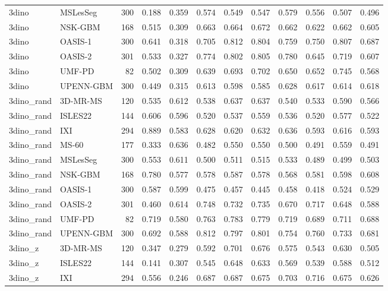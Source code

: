 \begin{tabular}{llrrrrrrrrrr}
3dino & MSLesSeg & 300 & 0.188 & 0.359 & 0.574 & 0.549 & 0.547 & 0.579 & 0.556 & 0.507 & 0.496 \\
3dino & NSK-GBM & 168 & 0.515 & 0.309 & 0.663 & 0.664 & 0.672 & 0.662 & 0.622 & 0.662 & 0.605 \\
3dino & OASIS-1 & 300 & 0.641 & 0.318 & 0.705 & 0.812 & 0.804 & 0.759 & 0.750 & 0.807 & 0.687 \\
3dino & OASIS-2 & 301 & 0.533 & 0.327 & 0.774 & 0.802 & 0.805 & 0.780 & 0.645 & 0.719 & 0.607 \\
3dino & UMF-PD & 82 & 0.502 & 0.309 & 0.639 & 0.693 & 0.702 & 0.650 & 0.652 & 0.745 & 0.568 \\
3dino & UPENN-GBM & 300 & 0.449 & 0.315 & 0.613 & 0.598 & 0.585 & 0.628 & 0.617 & 0.614 & 0.618 \\
3dino\_rand & 3D-MR-MS & 120 & 0.535 & 0.612 & 0.538 & 0.637 & 0.637 & 0.540 & 0.533 & 0.590 & 0.566 \\
3dino\_rand & ISLES22 & 144 & 0.606 & 0.596 & 0.520 & 0.537 & 0.559 & 0.536 & 0.520 & 0.577 & 0.522 \\
3dino\_rand & IXI & 294 & 0.889 & 0.583 & 0.628 & 0.620 & 0.632 & 0.636 & 0.593 & 0.616 & 0.593 \\
3dino\_rand & MS-60 & 177 & 0.333 & 0.636 & 0.482 & 0.550 & 0.550 & 0.500 & 0.491 & 0.559 & 0.491 \\
3dino\_rand & MSLesSeg & 300 & 0.553 & 0.611 & 0.500 & 0.511 & 0.515 & 0.533 & 0.489 & 0.499 & 0.503 \\
3dino\_rand & NSK-GBM & 168 & 0.780 & 0.577 & 0.578 & 0.587 & 0.578 & 0.568 & 0.581 & 0.598 & 0.608 \\
3dino\_rand & OASIS-1 & 300 & 0.587 & 0.599 & 0.475 & 0.457 & 0.445 & 0.458 & 0.418 & 0.524 & 0.529 \\
3dino\_rand & OASIS-2 & 301 & 0.460 & 0.614 & 0.748 & 0.732 & 0.735 & 0.670 & 0.717 & 0.648 & 0.588 \\
3dino\_rand & UMF-PD & 82 & 0.719 & 0.580 & 0.763 & 0.783 & 0.779 & 0.719 & 0.689 & 0.711 & 0.688 \\
3dino\_rand & UPENN-GBM & 300 & 0.692 & 0.588 & 0.812 & 0.797 & 0.801 & 0.754 & 0.760 & 0.733 & 0.681 \\
3dino\_z & 3D-MR-MS & 120 & 0.347 & 0.279 & 0.592 & 0.701 & 0.676 & 0.575 & 0.543 & 0.630 & 0.505 \\
3dino\_z & ISLES22 & 144 & 0.141 & 0.307 & 0.545 & 0.648 & 0.633 & 0.569 & 0.539 & 0.588 & 0.512 \\
3dino\_z & IXI & 294 & 0.556 & 0.246 & 0.687 & 0.687 & 0.675 & 0.703 & 0.716 & 0.675 & 0.626 \\

\end{tabular}
